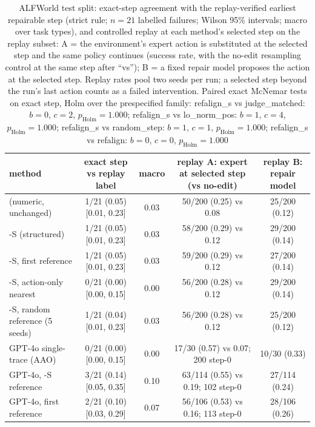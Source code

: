 \begin{table}[!t]
\caption{ALFWorld test split: exact-step agreement with the replay-verified earliest repairable step (strict rule; $n{=}21$ labelled failures; Wilson 95\% intervals; macro over task types), and controlled replay at each method's selected step on the replay subset: A = the environment's expert action is substituted at the selected step and the same policy continues (success rate, with the no-edit resampling control at the same step after ``vs''); B = a fixed repair model proposes the action at the selected step. Replay rates pool two seeds per run; a selected step beyond the run's last action counts as a failed intervention. Paired exact McNemar tests on exact step, Holm over the prespecified family: refalign\_s vs judge\_matched: $b{=}0$, $c{=}2$, $p_{\mathrm{Holm}}{=}1.000$; refalign\_s vs lo\_norm\_pos: $b{=}1$, $c{=}4$, $p_{\mathrm{Holm}}{=}1.000$; refalign\_s vs random\_step: $b{=}1$, $c{=}1$, $p_{\mathrm{Holm}}{=}1.000$; refalign\_s vs refalign: $b{=}0$, $c{=}0$, $p_{\mathrm{Holm}}{=}1.000$}
\label{tab:alf-main}
\centering\scriptsize
\setlength{\tabcolsep}{3pt}
\begin{tabular}{lcccc}
\toprule
method & exact step vs replay label & macro & replay A: expert at selected step (vs no-edit) & replay B: repair model \\
\midrule
\pha{} (numeric, unchanged) & 1/21 (0.05) [0.01, 0.23] & 0.03 & 50/200 (0.25) vs 0.08 & 25/200 (0.12) \\
\pha{}-S (structured) & 1/21 (0.05) [0.01, 0.23] & 0.03 & 58/200 (0.29) vs 0.12 & 29/200 (0.14) \\
\pha{}-S, first reference & 1/21 (0.05) [0.01, 0.23] & 0.03 & 59/200 (0.29) vs 0.12 & 27/200 (0.14) \\
\pha{}-S, action-only nearest & 0/21 (0.00) [0.00, 0.15] & 0.00 & 56/200 (0.28) vs 0.12 & 29/200 (0.14) \\
\pha{}-S, random reference (5 seeds) & 1/21 (0.04) [0.01, 0.23] & 0.03 & 56/200 (0.28) vs 0.12 & 25/200 (0.12) \\
GPT-4o single-trace (AAO) & 0/21 (0.00) [0.00, 0.15] & 0.00 & 17/30 (0.57) vs 0.07; 200 step-0 & 10/30 (0.33) \\
GPT-4o, \pha{}-S reference & 3/21 (0.14) [0.05, 0.35] & 0.10 & 63/114 (0.55) vs 0.19; 102 step-0 & 27/114 (0.24) \\
GPT-4o, first reference & 2/21 (0.10) [0.03, 0.29] & 0.07 & 56/106 (0.53) vs 0.16; 113 step-0 & 28/106 (0.26) \\

\end{tabular}
\end{table}
